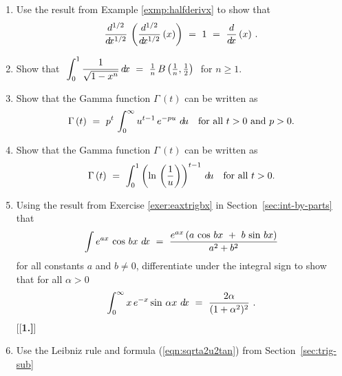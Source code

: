 {\begin{enumerate}[\bfseries 1.]
  \ref{exer:intsinmcosn} above, to show that for $m=1$, $2$, $3$, $\ldots$,
\[
\int_0^{\pi/2} \sin^{2m}\theta~\dtheta ~=~
\frac{\sqrt{\pi}\;\Gamma\,\left(m + \frac{1}{2}\right)}{2\,(m!)} \qquad\text{and}\qquad
\int_0^{\pi/2} \sin^{2m+1}\theta~\dtheta ~=~
\frac{\sqrt{\pi}\;(m!)}{2\,\Gamma\,\left(m + \frac{3}{2}\right)} ~.
\]
\newpage
{}
 \item Use the result from Example \ref{exmp:halfderivx} to show that
\[
\frac{d^{1/2}}{d\!x^{1/2}}\,\left(\frac{d^{1/2}}{d\!x^{1/2}}\,(x)\right) ~=~ 1 ~=~
\frac{d}{d\!x}\,(x) ~.
\]
 \item Show that $~\displaystyle\int_0^1 \dfrac{1}{\sqrt{1 - x^n}}\,d\!x ~=~ 
  \tfrac{1}{n}\,B\left(\tfrac{1}{n},\tfrac{1}{2}\right)~$ for $n \ge 1$.
 \item Show that the Gamma function $\Gamma\,(t)$ can be written as
\[
\Gamma\,(t) ~=~ p^t\,\int_0^{\infty} u^{t-1} \,e^{-pu}~d\!u
 \quad\text{for all $t > 0$ and $p > 0$.}
\]
 \item Show that the Gamma function $\Gamma\,(t)$ can be written as
\[
\Gamma\,(t) ~=~ \int_0^1 \left(\ln\,\left(\frac{1}{u}\right)\right)^{t-1}\,d\!u
 \quad\text{for all $t > 0$.}
\]
 \item Using the result from Exercise \ref{exer:eaxtrigbx}  in Section~\ref{sec:int-by-parts} that
\[
\int e^{ax}\,\cos\,bx~d\!x ~=~ \frac{e^{ax}\,(a\,\cos\,bx ~+~ b\,\sin\,bx)}{a^2 + b^2}
\]
for all constants $a$ and $b \ne 0$, differentiate under the integral sign to
show that for all $\alpha > 0$
\[
\int_0^{\infty} x\,e^{-x} \sin\,\alpha x~d\!x ~=~ \frac{2 \alpha}{(1 + \alpha^2)^2} ~.
\]
[{[\bfseries 1.]}]
 \item Use the Leibniz rule and formula (\ref{eqn:sqrta2u2tan}) from Section~\ref{sec:trig-sub}

\end{enumerate}}
